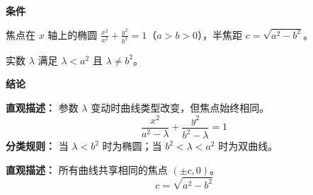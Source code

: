 \begin{statementbox}
	\textbf{\textcolor{CStatement}{条件}}
	\begin{description}[style=nextline,leftmargin=2.8em,labelsep=0.5em,itemsep=0.35em]
		\item[\textbf{\textcolor{CStatement}{条件1（椭圆参数）：}}]
			焦点在 $x$ 轴上的椭圆 $\frac{x^{2}}{a^{2}}+\frac{y^{2}}{b^{2}}=1$（$a>b>0$），半焦距 $c=\sqrt{a^{2}-b^{2}}$。
		\item[\textbf{\textcolor{CStatement}{条件2（参数范围）：}}]
			实数 $\lambda$ 满足 $\lambda<a^{2}$ 且 $\lambda\neq b^{2}$。
	\end{description}

	\medskip
	\textbf{\textcolor{CStatement}{结论}}
	\begin{description}[style=nextline,leftmargin=2.8em,labelsep=0.5em,itemsep=0.45em]
		\item[\textbf{\textcolor{CStatement}{结论一（曲线系方程）：}}]
			\textbf{\textcolor{CStatement}{直观描述：}}
			参数 $\lambda$ 变动时曲线类型改变，但焦点始终相同。
			\[
				\frac{x^{2}}{a^{2}-\lambda}+\frac{y^{2}}{b^{2}-\lambda}=1
			\]
			\textbf{\textcolor{CStatement}{分类规则：}}
			当 $\lambda<b^{2}$ 时为椭圆；当 $b^{2}<\lambda<a^{2}$ 时为双曲线。
		\item[\textbf{\textcolor{CStatement}{推广结论（焦点恒定）：}}]
			\textbf{\textcolor{CStatement}{直观描述：}}
			所有曲线共享相同的焦点 $(\pm c,0)$。
			\[
				c=\sqrt{a^{2}-b^{2}}
			\]
	\end{description}

\end{statementbox}
